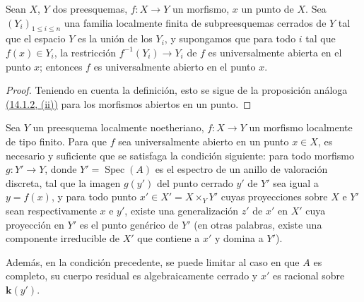 \begin{proposition}[14.3.5]
\label{IV.14.3.5}
Sean $X$, $Y$ dos preesquemas, $f:X\to Y$ un morfismo, $x$ un punto de $X$.
Sea $(Y_i)_{1\leq i\leq n}$ una familia localmente finita de subpreesquemas cerrados de $Y$ tal que el espacio $Y$ es la unión de los $Y_i$, y supongamos que para todo $i$ tal que $f(x)\in Y_i$, la restricción $f^{-1}(Y_i)\to Y_i$ de $f$ es universalmente abierta en el punto $x$; entonces $f$ es universalmente abierto en el punto $x$.
\end{proposition}

\begin{proof}
Teniendo en cuenta la definición, esto se sigue de la proposición análoga {\hyperlink{ega4.c04.prop.14-1-2}{(14.1.2, (ii))}} para los morfismos abiertos en un punto.
\end{proof}

\begin{proposition}[14.3.6]
\label{IV.14.3.6}
Sea $Y$ un preesquema localmente noetheriano, $f:X\to Y$ un morfismo localmente de tipo finito.
Para que $f$ sea universalmente abierto en un punto $x\in X$, es necesario y suficiente que se satisfaga la condición siguiente: para todo morfismo $g:Y'\to Y$, donde $Y'=\operatorname{Spec}(A)$ es el espectro de un anillo de valoración discreta, tal que la imagen $g(y')$ del punto cerrado $y'$ de $Y'$ sea igual a $y=f(x)$, y para todo punto $x'\in X'=X\times_Y Y'$ cuyas proyecciones sobre $X$ e $Y'$ sean respectivamente $x$ e $y'$, existe una generalización $z'$ de $x'$ en $X'$ cuya proyección en $Y'$ es el punto genérico de $Y'$ \textup{(en otras palabras,} existe una componente irreducible de $X'$ que contiene a $x'$ y domina a $Y'$\textup{)}.


Además, en la condición precedente, se puede limitar al caso en que $A$ es completo, su cuerpo residual es algebraicamente cerrado y $x'$ es racional sobre $\boldsymbol{k}(y')$.
\end{proposition}

